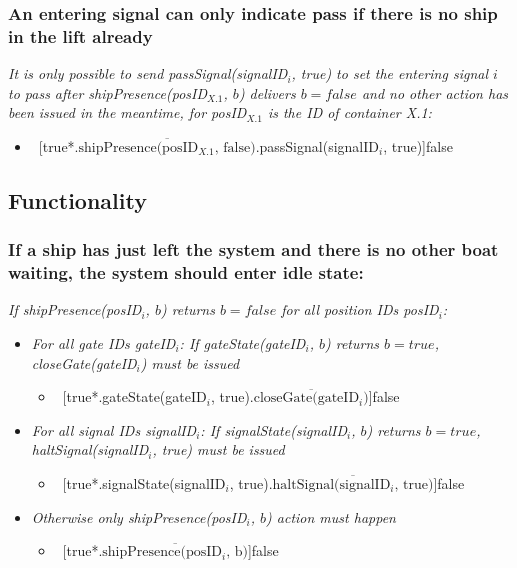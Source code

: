 \subsubsection{An entering signal can only indicate pass if there is no ship in the lift already}
\textit{It is only possible to send passSignal(signalID$_i$, true) to set the entering signal $i$ to pass after shipPresence(posID$_{X.1}$, $b$) delivers $b = false$ and no other action has been issued in the meantime, for posID$_{X.1}$ is the ID of container X.1:}
	\begin{itemize}
		\item ~[true*.$\overline{\textrm{shipPresence(posID$_{X.1}$, false)}}$.passSignal(signalID$_i$, true)]false
	\end{itemize}

	
\subsection{Functionality}
\subsubsection{If a ship has just left the system and there is no other boat waiting, the system should enter idle state:}
\textit{If shipPresence(posID$_i$, $b$) returns $b = false$ for all position IDs posID$_i$:}
	\begin{itemize}
		\item \textit{For all gate IDs gateID$_i$: If gateState(gateID$_i$, $b$) returns $b = true$, \linebreak closeGate(gateID$_i$) must be issued}
		\begin{itemize}
			\item ~[true*.gateState(gateID$_i$, true).$\overline{\textrm{closeGate(gateID$_i$)}}$]false
		\end{itemize}
		\item \textit{For all signal IDs signalID$_i$: If signalState(signalID$_i$, $b$) returns $b = true$, haltSignal(signalID$_i$, true) must be issued}
		\begin{itemize}
			\item ~[true*.signalState(signalID$_i$, true).$\overline{\textrm{haltSignal(signalID$_i$, true)}}$]false
		\end{itemize}
		\item \textit{Otherwise only shipPresence(posID$_i$, $b$) action must happen}
		\begin{itemize}
			\item ~[true*.$\overline{\textrm{shipPresence(posID$_i$, b)}}$]false
		\end{itemize}
	\end{itemize}
	
